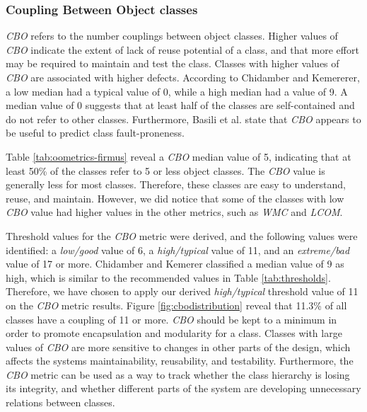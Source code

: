 \subsubsection{Coupling Between Object classes}

\textit{CBO} refers to the number couplings between object classes. Higher values of \textit{CBO} indicate the extent of lack of reuse potential of a class, and that more effort may be required to maintain and test the class. Classes with higher values of \textit{CBO} are associated with higher defects\cite{subramanyam2003empirical}. According to Chidamber and Kemererer\cite{chidamber1994metrics}, a low median had a typical value of 0, while a high median had a value of 9. A median value of 0 suggests that at least half of the classes are self-contained and do not refer to other classes. Furthermore, Basili et al.\cite{basili1996validation} state that \textit{CBO} appears to be useful to predict class fault-proneness. 

Table \ref{tab:oometrics-firmus} reveal a \textit{CBO} median value of 5, indicating that at least 50\% of the classes refer to 5 or less object classes. The \textit{CBO} value is generally less for most classes. Therefore, these classes are easy to understand, reuse, and maintain. However, we did notice that some of the classes with low \textit{CBO} value had higher values in the other metrics, such as \textit{WMC} and \textit{LCOM}. 

Threshold values for the \textit{CBO} metric were derived, and the following values were identified: a \textit{low/good} value of 6, a \textit{high/typical} value of 11, and an \textit{extreme/bad} value of 17 or more. Chidamber and Kemerer\cite{chidamber1994metrics} classified a median value of 9 as high, which is similar to the recommended values in Table \ref{tab:thresholds}. Therefore, we have chosen to apply our derived \textit{high/typical} threshold value of 11 on the \textit{CBO} metric results. Figure \ref{fig:cbodistribution} reveal that 11.3\% of all classes have a coupling of 11 or more. \textit{CBO} should be kept to a minimum in order to promote encapsulation and modularity for a class. Classes with large values of \textit{CBO} are more sensitive to changes in other parts of the design, which affects the systems maintainability, reusability, and testability. Furthermore, the \textit{CBO} metric can be used as a way to track whether the class hierarchy is losing its integrity, and whether different parts of the system are developing unnecessary relations between classes.



